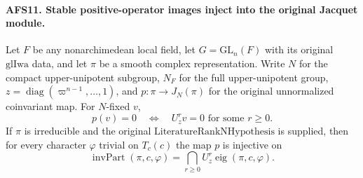 \documentclass[11pt,a4paper]{article}
\numberwithin{equation}{section}
\theoremstyle{remark}\newtheorem{remark}[theorem]{Remark}
\begin{document}
\paragraph{AFS11. Stable positive-operator images inject into the original Jacquet module.}
\label{claim:AFS11}
Let $F$ be any nonarchimedean local field, let
$G=\mathrm{GL}_n(F)$ with its original $\mathrm{glIwa}$ data,
and let $\pi$ be a smooth complex representation.  Write
$N$ for the compact upper-unipotent subgroup, $N_F$ for the
full upper-unipotent group, $z=\operatorname{diag}
(\varpi^{n-1},\ldots,1)$, and $p:\pi\to J_N(\pi)$ for the
original unnormalized coinvariant map.  For $N$-fixed $v$,
\begin{equation}\label{eq:afs-jac-kernel}
 p(v)=0\quad\Longleftrightarrow\quad
                      U_z^rv=0\text{ for some }r\geq0.
\end{equation}
If $\pi$ is irreducible and the original
$\mathrm{LiteratureRankNHypothesis}$ is supplied, then for
every character $\varphi$ trivial on $T_c(c)$ the map $p$
is injective on
\[
 \operatorname{invPart}(\pi,c,\varphi)
       =\bigcap_{r\geq0}U_z^r\operatorname{eig}(\pi,c,\varphi).
\]
\end{document}
